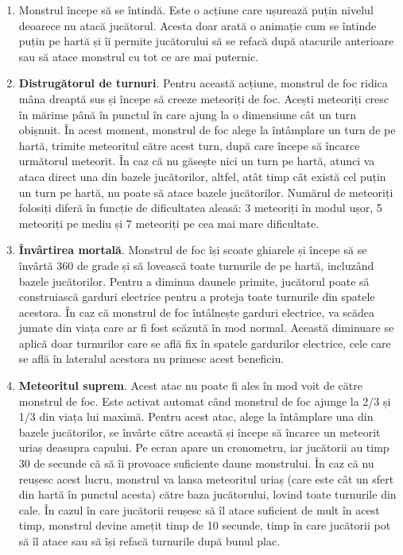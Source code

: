 \documentclass[12pt, a4paper]{article}
\begin{document}
	\begin{enumerate}
		\item Monstrul începe să se întindă. Este o acțiune care ușurează puțin nivelul deoarece nu atacă jucătorul. Acesta doar arată o animație cum se întinde puțin pe hartă și îi permite jucătorului să se refacă după atacurile anterioare sau să atace monstrul cu tot ce are mai puternic.
		\item \textbf{Distrugătorul de turnuri}. Pentru această acțiune, monstrul de foc ridica mâna dreaptă sus și începe să creeze meteoriți de foc. Acești meteoriți cresc în mărime până în punctul în care ajung la o dimensiune cât un turn obișnuit. În acest moment, monstrul de foc alege la întâmplare un turn de pe hartă, trimite meteoritul către acest turn, după care începe să încarce următorul meteorit. În caz că nu găsește nici un turn pe hartă, atunci va ataca direct una din bazele jucătorilor, altfel, atât timp cât există cel puțin un turn pe hartă, nu poate să atace bazele jucătorilor. Numărul de meteoriți folosiți diferă în funcție de dificultatea aleasă: 3 meteoriți în modul ușor, 5 meteoriți pe mediu și 7 meteoriți pe cea mai mare dificultate.
		\item \textbf{Învârtirea mortală}. Monstrul de foc își scoate ghiarele și începe să se învârtă 360 de grade și să lovească toate turnurile de pe hartă, incluzând bazele jucătorilor. Pentru a diminua daunele primite, jucătorul poate să construiască garduri electrice pentru a proteja toate turnurile din spatele acestora. În caz că monstrul de foc întâlnește garduri electrice, va scădea jumate din viața care ar fi fost scăzută în mod normal. Această diminuare se aplică doar turnurilor care se află fix în spatele gardurilor electrice, cele care se află în lateralul acestora nu primesc acest beneficiu.
		\item \textbf{Meteoritul suprem}. Acest atac nu poate fi ales în mod voit de către monstrul de foc. Este activat automat când monstrul de foc ajunge la 2/3 și 1/3 din viața lui maximă. Pentru acest atac, alege la întâmplare una din bazele jucătorilor, se învârte către această și începe să încarce un meteorit uriaș deasupra capului. Pe ecran apare un cronometru, iar jucătorii au timp 30 de secunde că să îi provoace suficiente daune monstrului. În caz că nu reușesc acest lucru, monstrul va lansa meteoritul uriaș (care este cât un sfert din hartă în punctul acesta) către baza jucătorului, lovind toate turnurile din cale. În cazul în care jucătorii reușesc să îl atace suficient de mult în acest timp, monstrul devine amețit timp de 10 secunde, timp în care jucătorii pot să îl atace sau să își refacă turnurile după bunul plac.
	\end{enumerate}
	
\end{document}
